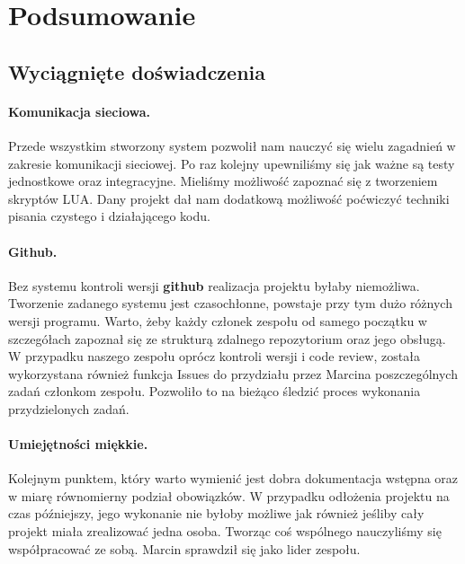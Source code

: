\documentclass[paper=a4, fontsize=11pt]{scrartcl} %
\begin{document}
\section{Podsumowanie}
\subsection{Wyciągnięte doświadczenia}
\paragraph*{Komunikacja sieciowa.}
Przede wszystkim stworzony system pozwolił nam nauczyć się wielu zagadnień w zakresie
komunikacji sieciowej. Po raz kolejny upewniliśmy się jak ważne są testy jednostkowe oraz integracyjne. Mieliśmy możliwość zapoznać się z tworzeniem skryptów LUA. 
Dany projekt dał nam dodatkową możliwość poćwiczyć techniki pisania czystego i działającego kodu. 
\paragraph*{Github.} 
Bez systemu kontroli wersji \textbf{github} realizacja projektu byłaby niemożliwa. Tworzenie zadanego systemu jest czasochłonne, powstaje przy tym dużo różnych wersji programu. Warto, żeby każdy członek zespołu  od samego początku w szczegółach zapoznał się ze strukturą zdalnego repozytorium oraz jego obsługą. W przypadku naszego zespołu oprócz kontroli wersji i code review, została wykorzystana również funkcja Issues do przydziału przez Marcina poszczególnych zadań członkom zespołu. Pozwoliło to na bieżąco śledzić proces wykonania przydzielonych zadań. 
\paragraph*{Umiejętności miękkie.}
Kolejnym punktem, który warto wymienić jest dobra dokumentacja wstępna oraz w miarę równomierny podział obowiązków. W przypadku odłożenia projektu na czas późniejszy, jego wykonanie nie byłoby możliwe jak również jeśliby cały projekt miała zrealizować jedna osoba. Tworząc coś wspólnego nauczyliśmy się współpracować ze sobą. Marcin sprawdził się jako lider zespołu.
\end{document}
